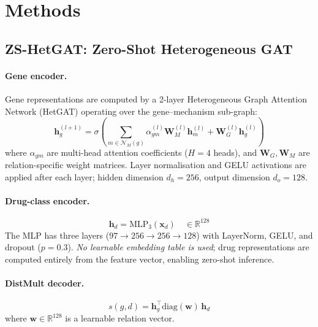\documentclass[conference]{IEEEtran}
\begin{document}
\section{Methods}
\label{sec:method}

\subsection{ZS-HetGAT: Zero-Shot Heterogeneous GAT}

\paragraph{Gene encoder.}
Gene representations are computed by a 2-layer Heterogeneous Graph
Attention Network (HetGAT) operating over the gene–mechanism sub-graph:
\begin{equation}
  \mathbf{h}_g^{(l+1)} = \sigma\!\left(
    \sum_{m \in \mathcal{N}_M(g)} \alpha_{gm}^{(l)} \mathbf{W}_M^{(l)} \mathbf{h}_m^{(l)}
    + \mathbf{W}_G^{(l)} \mathbf{h}_g^{(l)}
  \right)
\end{equation}
where $\alpha_{gm}$ are multi-head attention coefficients
($H=4$ heads), and $\mathbf{W}_G, \mathbf{W}_M$ are relation-specific
weight matrices. Layer normalisation and GELU activations are applied
after each layer; hidden dimension $d_h = 256$, output dimension $d_o = 128$.

\paragraph{Drug-class encoder.}
\begin{equation}
  \mathbf{h}_d = \mathrm{MLP}_3\!\left(\mathbf{x}_d\right)
  \quad \in \mathbb{R}^{128}
\end{equation}
The MLP has three layers ($97 \to 256 \to 256 \to 128$) with LayerNorm,
GELU, and dropout ($p=0.3$). \emph{No learnable embedding table is used};
drug representations are computed entirely from the feature vector,
enabling zero-shot inference.

\paragraph{DistMult decoder.}
\begin{equation}
  s(g,d) = \mathbf{h}_g^\top \mathrm{diag}(\mathbf{w}) \,\mathbf{h}_d
  \label{eq:decoder}
\end{equation}
where $\mathbf{w} \in \mathbb{R}^{128}$ is a learnable relation vector.
\end{document}
